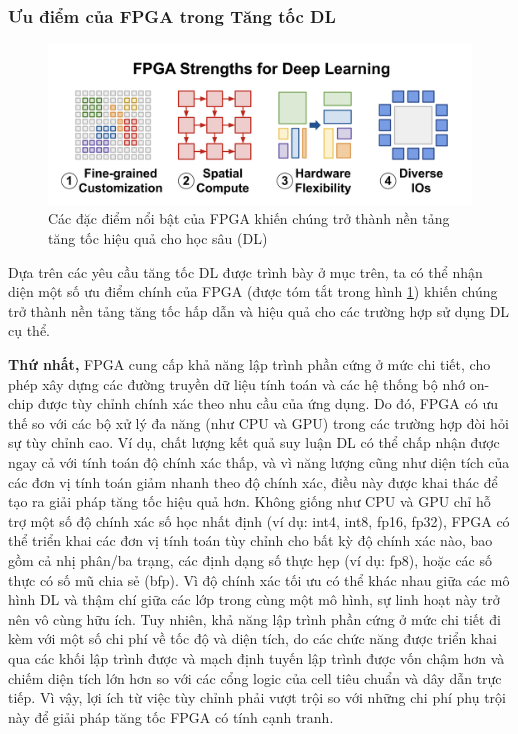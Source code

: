 \documentclass[a4paper]{article}
\begin{document}
\subsubsection{Ưu điểm của FPGA trong Tăng tốc DL}
\begin{figure} [!h]
    \centering
    \includegraphics[width=0.75\linewidth]{assets/fpga_3.png}
    \caption{Các đặc điểm nổi bật của FPGA khiến chúng trở thành nền tảng tăng tốc hiệu quả cho học sâu (DL)}
    \label{fig:fpga_3}
\end{figure}
Dựa trên các yêu cầu tăng tốc DL được trình bày ở mục trên, ta có thể nhận diện một số ưu điểm chính của FPGA (được tóm tắt trong hình \ref{fig:fpga_3}) khiến chúng trở thành nền tảng tăng tốc hấp dẫn và hiệu quả cho các trường hợp sử dụng DL cụ thể.

\textbf{Thứ nhất,} FPGA cung cấp khả năng lập trình phần cứng ở mức chi tiết, cho phép xây dựng các đường truyền dữ liệu tính toán và các hệ thống bộ nhớ on-chip được tùy chỉnh chính xác theo nhu cầu của ứng dụng. Do đó, FPGA có ưu thế so với các bộ xử lý đa năng (như CPU và GPU) trong các trường hợp đòi hỏi sự tùy chỉnh cao. Ví dụ, chất lượng kết quả suy luận DL có thể chấp nhận được ngay cả với tính toán độ chính xác thấp, và vì năng lượng cũng như diện tích của các đơn vị tính toán giảm nhanh theo độ chính xác, điều này được khai thác để tạo ra giải pháp tăng tốc hiệu quả hơn. Không giống như CPU và GPU chỉ hỗ trợ một số độ chính xác số học nhất định (ví dụ: int4, int8, fp16, fp32), FPGA có thể triển khai các đơn vị tính toán tùy chỉnh cho bất kỳ độ chính xác nào, bao gồm cả nhị phân/ba trạng, các định dạng số thực hẹp (ví dụ: fp8), hoặc các số thực có số mũ chia sẻ (bfp). Vì độ chính xác tối ưu có thể khác nhau giữa các mô hình DL và thậm chí giữa các lớp trong cùng một mô hình, sự linh hoạt này trở nên vô cùng hữu ích. Tuy nhiên, khả năng lập trình phần cứng ở mức chi tiết đi kèm với một số chi phí về tốc độ và diện tích, do các chức năng được triển khai qua các khối lập trình được và mạch định tuyến lập trình được vốn chậm hơn và chiếm diện tích lớn hơn so với các cổng logic của cell tiêu chuẩn và dây dẫn trực tiếp. Vì vậy, lợi ích từ việc tùy chỉnh phải vượt trội so với những chi phí phụ trội này để giải pháp tăng tốc FPGA có tính cạnh tranh.
\end{document}
